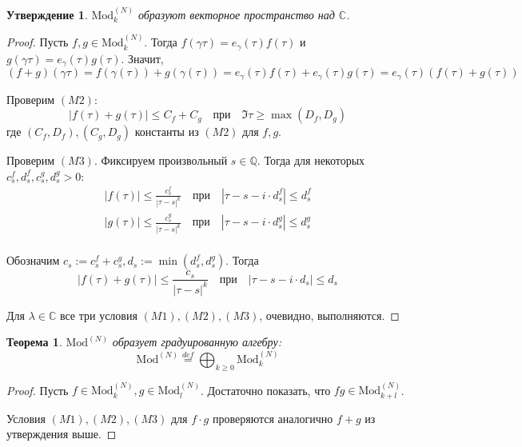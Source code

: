 \documentclass{article}
\newcommand{\CC}{\mathbb{C}}
\newcommand{\QQ}{\mathbb{Q}}
\theoremstyle{break}
\newtheorem{theorem}{Теорема}[section]
\newtheorem{claim}{Утверждение}[section]
\newcommand{\ModkN}[2]{\text{Mod}_{#1}^{(#2)}}
\newcommand{\ModN}[1]{\text{Mod}^{(#1)}}
\begin{document}
\begin{claim}
	$\ModkN{k}{N}$ образуют векторное пространство над $\CC$.
\end{claim}
\begin{proof}
Пусть $f, g \in  \ModkN{k}{N}$. Тогда $f(\gamma \tau) = e_{\gamma}(\tau) f(\tau)$
и $g(\gamma \tau) = e_{\gamma}(\tau) g(\tau)$. Значит,
\begin{equation}
(f + g)(\gamma \tau) = f(\gamma(\tau)) + g(\gamma(\tau)) 
= e_\gamma(\tau)f(\tau) + e_\gamma(\tau)g(\tau)
= e_\gamma(\tau)(f(\tau) + g(\tau))
\end{equation}

Проверим $(M2)$: 
\begin{equation}
|f(\tau) + g(\tau)| \le C_f + C_g \quad \text{при} \quad 
\Im \tau \ge \max(D_f, D_g)
\end{equation}
где $(C_f, D_f), (C_g, D_g)$ константы из $(M2)$ для $f, g$.

Проверим $(M3)$. Фиксируем произвольный $s \in \QQ$. Тогда для некоторых 
$c_s^f, d_s^f, c_s^g, d_s^g > 0$:
\begin{gather*}
	|f(\tau)| \le \frac{c_s^f}{|\tau - s|^k} \quad \text{при} \quad 
		|\tau - s - i \cdot d_s^f| \le d_s^f \\	
	|g(\tau)| \le \frac{c_s^g}{|\tau - s|^k} \quad \text{при} \quad 
		|\tau - s - i \cdot d_s^g| \le d_s^g \\
\end{gather*}

Обозначим $c_s:=c_s^f + c_s^g, d_s:=\min(d_s^f, d_s^g)$. Тогда
\begin{equation}
	|f(\tau) + g(\tau)| \le \frac{c_s}{|\tau - s|^k} \quad \text{при} \quad
	|\tau - s - i \cdot d_s| \le d_s
\end{equation}


Для $\lambda \in \CC$ все три условия $(M1), (M2), (M3)$, очевидно, выполняются.


\end{proof}

\begin{theorem}
	$\ModN{N}$ образует градуированную алгебру:
	\begin{equation}
	\ModN{N} \stackrel{def}{=} \bigoplus_{k \ge 0} \ModkN{k}{N}
	\end{equation}
\end{theorem}

\begin{proof}
	Пусть $f \in \ModkN{k}{N}, g \in \ModkN{l}{N}$. Достаточно показать, что 
	$fg \in \ModkN{k+l}{N}$. 
	
	Условия $(M1), (M2), (M3)$ для $f \cdot g$ проверяются аналогично $f+g$ из утверждения выше.
\end{proof}
\end{document}
